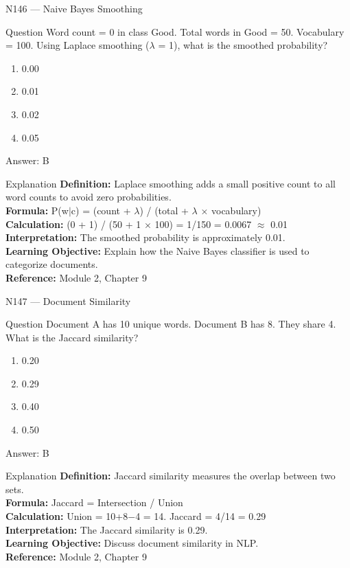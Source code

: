 \documentclass[aspectratio=169,8pt]{beamer}
\begin{document}
	\begin{frame}{N146 --- Naive Bayes Smoothing}
		\begin{block}{Question}
			Word count = 0 in class Good. Total words in Good = 50. Vocabulary = 100. Using Laplace smoothing ($\lambda$ = 1), what is the smoothed probability?
			\begin{enumerate}
				\item 0.00
				\item 0.01
				\item 0.02
				\item 0.05
			\end{enumerate}
		\end{block}
		\begin{exampleblock}{Answer: B}\end{exampleblock}
		\begin{block}{Explanation}
			\textbf{Definition:} Laplace smoothing adds a small positive count to all word counts to avoid zero probabilities.\\
			\textbf{Formula:} P(w$|$c) = (count + $\lambda$) / (total + $\lambda$ $\times$ vocabulary)\\
			\textbf{Calculation:} (0 + 1) / (50 + 1 $\times$ 100) = 1/150 = 0.0067 $\approx$ 0.01\\
			\textbf{Interpretation:} The smoothed probability is approximately 0.01.\\
			\textbf{Learning Objective:} Explain how the Naive Bayes classifier is used to categorize documents.\\
			\textbf{Reference:} Module 2, Chapter 9
		\end{block}
	\end{frame}
	
	\begin{frame}{N147 --- Document Similarity}
		\begin{block}{Question}
			Document A has 10 unique words. Document B has 8. They share 4. What is the Jaccard similarity?
			\begin{enumerate}
				\item 0.20
				\item 0.29
				\item 0.40
				\item 0.50
			\end{enumerate}
		\end{block}
		\begin{exampleblock}{Answer: B}\end{exampleblock}
		\begin{block}{Explanation}
			\textbf{Definition:} Jaccard similarity measures the overlap between two sets.\\
			\textbf{Formula:} Jaccard = Intersection / Union\\
			\textbf{Calculation:} Union = 10+8$-$4 = 14. Jaccard = 4/14 = 0.29\\
			\textbf{Interpretation:} The Jaccard similarity is 0.29.\\
			\textbf{Learning Objective:} Discuss document similarity in NLP.\\
			\textbf{Reference:} Module 2, Chapter 9
		\end{block}
	\end{frame}
	
\end{document}
